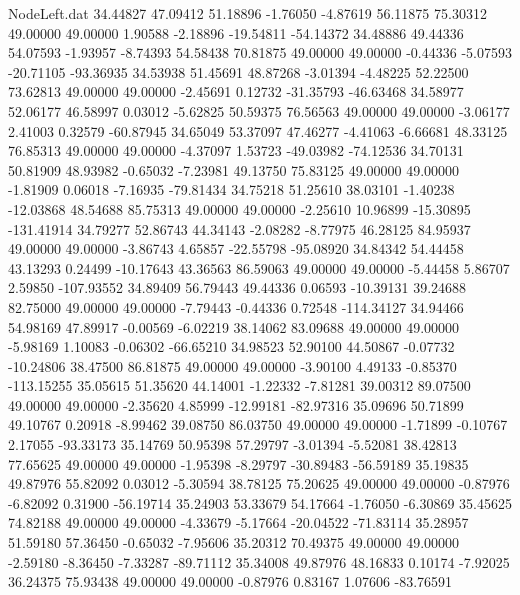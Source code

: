 \begin{filecontents}{NodeLeft.dat}
  34.44827   47.09412   51.18896    -1.76050   -4.87619   56.11875   75.30312   49.00000   49.00000    1.90588   -2.18896  -19.54811  -54.14372
  34.48886   49.44336   54.07593    -1.93957   -8.74393   54.58438   70.81875   49.00000   49.00000   -0.44336   -5.07593  -20.71105  -93.36935
  34.53938   51.45691   48.87268    -3.01394   -4.48225   52.22500   73.62813   49.00000   49.00000   -2.45691    0.12732  -31.35793  -46.63468
  34.58977   52.06177   46.58997     0.03012   -5.62825   50.59375   76.56563   49.00000   49.00000   -3.06177    2.41003    0.32579  -60.87945
  34.65049   53.37097   47.46277    -4.41063   -6.66681   48.33125   76.85313   49.00000   49.00000   -4.37097    1.53723  -49.03982  -74.12536
  34.70131   50.81909   48.93982    -0.65032   -7.23981   49.13750   75.83125   49.00000   49.00000   -1.81909    0.06018   -7.16935  -79.81434
  34.75218   51.25610   38.03101    -1.40238  -12.03868   48.54688   85.75313   49.00000   49.00000   -2.25610   10.96899  -15.30895 -131.41914
  34.79277   52.86743   44.34143    -2.08282   -8.77975   46.28125   84.95937   49.00000   49.00000   -3.86743    4.65857  -22.55798  -95.08920
  34.84342   54.44458   43.13293     0.24499  -10.17643   43.36563   86.59063   49.00000   49.00000   -5.44458    5.86707    2.59850 -107.93552
  34.89409   56.79443   49.44336     0.06593  -10.39131   39.24688   82.75000   49.00000   49.00000   -7.79443   -0.44336    0.72548 -114.34127
  34.94466   54.98169   47.89917    -0.00569   -6.02219   38.14062   83.09688   49.00000   49.00000   -5.98169    1.10083   -0.06302  -66.65210
  34.98523   52.90100   44.50867    -0.07732  -10.24806   38.47500   86.81875   49.00000   49.00000   -3.90100    4.49133   -0.85370 -113.15255
  35.05615   51.35620   44.14001    -1.22332   -7.81281   39.00312   89.07500   49.00000   49.00000   -2.35620    4.85999  -12.99181  -82.97316
  35.09696   50.71899   49.10767     0.20918   -8.99462   39.08750   86.03750   49.00000   49.00000   -1.71899   -0.10767    2.17055  -93.33173
  35.14769   50.95398   57.29797    -3.01394   -5.52081   38.42813   77.65625   49.00000   49.00000   -1.95398   -8.29797  -30.89483  -56.59189
  35.19835   49.87976   55.82092     0.03012   -5.30594   38.78125   75.20625   49.00000   49.00000   -0.87976   -6.82092    0.31900  -56.19714
  35.24903   53.33679   54.17664    -1.76050   -6.30869   35.45625   74.82188   49.00000   49.00000   -4.33679   -5.17664  -20.04522  -71.83114
  35.28957   51.59180   57.36450    -0.65032   -7.95606   35.20312   70.49375   49.00000   49.00000   -2.59180   -8.36450   -7.33287  -89.71112
  35.34008   49.87976   48.16833     0.10174   -7.92025   36.24375   75.93438   49.00000   49.00000   -0.87976    0.83167    1.07606  -83.76591

\end{filecontents}
